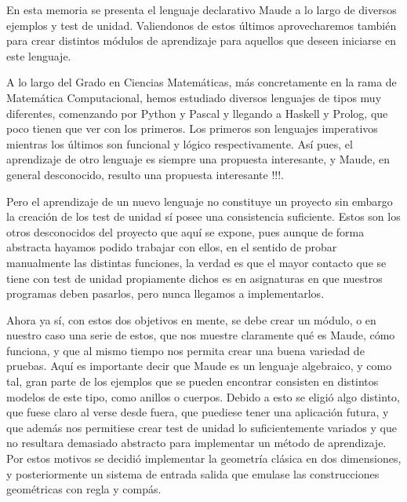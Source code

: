 
En esta memoria se presenta el lenguaje declarativo Maude a lo largo de diversos ejemplos y test de unidad. Valiendonos de estos últimos aprovecharemos también para crear distintos módulos de aprendizaje para aquellos que deseen iniciarse en este lenguaje.\par

A lo largo del Grado en Ciencias Matemáticas, más concretamente en la rama de Matemática Computacional, hemos estudiado diversos lenguajes de tipos muy diferentes, comenzando por Python y Pascal y llegando a Haskell y Prolog, que poco tienen que ver con los primeros. Los primeros son lenguajes imperativos mientras los últimos son funcional y lógico respectivamente. Así pues, el aprendizaje de otro lenguaje es siempre una propuesta interesante, y Maude, en  general desconocido, resulto una propuesta interesante !!!.\par

Pero el aprendizaje de un nuevo lenguaje no constituye un proyecto sin embargo la creación de los test de unidad sí posee una consistencia suficiente. Estos son los otros desconocidos del proyecto que aquí se expone, pues aunque de forma abstracta hayamos podido trabajar con ellos, en el sentido de probar manualmente las distintas funciones, la verdad es que el mayor contacto que se tiene con test de unidad propiamente dichos es en asignaturas en que nuestros programas deben pasarlos, pero nunca llegamos a implementarlos. \par

Ahora ya sí, con estos dos objetivos en mente, se debe crear un módulo, o en nuestro caso una serie de estos, que nos muestre claramente qué es Maude, cómo funciona, y que al mismo tiempo nos permita crear una buena variedad de pruebas. Aquí es importante decir que Maude es un lenguaje algebraico, y como tal, gran parte de los ejemplos que se pueden encontrar consisten en distintos modelos de este tipo, como anillos o cuerpos. Debido a esto se eligió algo distinto, que fuese claro al verse desde fuera, que puediese tener una aplicación futura, y que además nos permitiese crear test de unidad lo suficientemente variados y que no resultara demasiado abstracto para implementar un método de aprendizaje. Por estos motivos se decidió implementar la geometría clásica en dos dimensiones, y posteriormente un sistema de entrada salida que emulase las construcciones geométricas con regla y compás. \par

